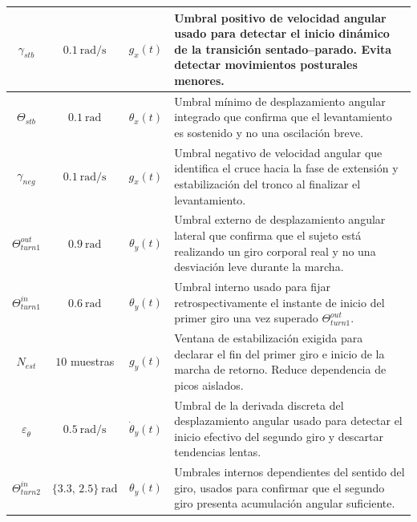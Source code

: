 \documentclass[12pt]{report}
\begin{document}
\begin{justify}
\begin{longtable}{|c|c|c|p{7.2cm}|}
        \hline
        \endlastfoot

        $\gamma_{stb}$               & $0.1~\text{rad/s}$         & $g_x(t)$            &
        Umbral positivo de velocidad angular usado para detectar el inicio dinámico de la transición sentado--parado. Evita detectar movimientos posturales menores.  \\ \hline

        $\Theta_{stb}$               & $0.1~\text{rad}$           & $\theta_x(t)$       &
        Umbral mínimo de desplazamiento angular integrado que confirma que el levantamiento es sostenido y no una oscilación breve.                                   \\ \hline

        $\gamma_{neg}$               & $0.1~\text{rad/s}$         & $g_x(t)$            &
        Umbral negativo de velocidad angular que identifica el cruce hacia la fase de extensión y estabilización del tronco al finalizar el levantamiento.            \\ \hline

        $\Theta_{turn1}^{out}$       & $0.9~\text{rad}$           & $\theta_y(t)$       &
        Umbral externo de desplazamiento angular lateral que confirma que el sujeto está realizando un giro corporal real y no una desviación leve durante la marcha. \\ \hline

        $\Theta_{turn1}^{in}$        & $0.6~\text{rad}$           & $\theta_y(t)$       &
        Umbral interno usado para fijar retrospectivamente el instante de inicio del primer giro una vez superado $\Theta_{turn1}^{out}$.                             \\ \hline

        $N_{est}$                    & $10$ muestras              & $g_y(t)$            &
        Ventana de estabilización exigida para declarar el fin del primer giro e inicio de la marcha de retorno. Reduce dependencia de picos aislados.                \\ \hline

        $\varepsilon_{\dot{\theta}}$ & $0.5~\text{rad/s}$         & $\dot{\theta}_y(t)$ &
        Umbral de la derivada discreta del desplazamiento angular usado para detectar el inicio efectivo del segundo giro y descartar tendencias lentas.              \\ \hline

        $\Theta_{turn2}^{in}$        & $\{3.3,\,2.5\}~\text{rad}$ & $\theta_y(t)$       &
        Umbrales internos dependientes del sentido del giro, usados para confirmar que el segundo giro presenta acumulación angular suficiente.                       \\ \hline


\end{longtable}
\end{justify}
\end{document}
